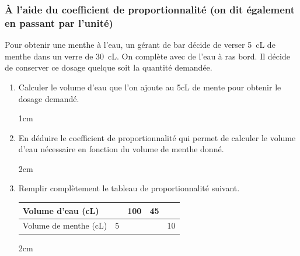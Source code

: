 \documentclass[a4paper]{book}
\begin{document}
\subsubsection{À l'aide du coefficient de proportionnalité (on dit également en passant par l'unité)}
    \begin{exemple}
        Pour obtenir une menthe à l'eau, un gérant de bar décide de verser 5~cL de menthe dans un verre de 30~cL. On complète avec de l'eau à ras bord. Il décide de conserver ce dosage quelque soit la quantité demandée.

        \begin{enumerate}[leftmargin=*]
            \item Calculer le volume d'eau que l'on ajoute au 5cL de mente pour obtenir le dosage demandé.
            \begin{ZoneReponse}{1cm}
            \end{ZoneReponse}

            \item En déduire le coefficient de proportionnalité qui permet de calculer le volume d'eau nécessaire en fonction du volume de menthe donné.
            \begin{ZoneReponse}{2cm}
            \end{ZoneReponse}

            \item Remplir complètement le tableau de proportionnalité suivant.
            \begin{center}
                \renewcommand{\arraystretch}{1.5}
                \begin{tabular}{|l|c|c|c|c|}
                    \hline
                    Volume d'eau (cL)       &   & 100 & 45 &    \\ \hline
                    Volume de menthe (cL)   & 5 &     &    & 10 \\ \hline
                \end{tabular}
            \end{center}            

            \begin{ZoneReponse}{2cm}
            \end{ZoneReponse}
        \end{enumerate}
    \end{exemple}
\end{document}
